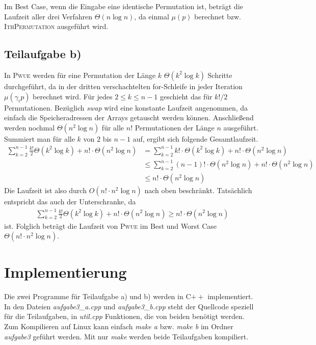 \documentclass[a4paper, 11pt, ngerman]{article}
\begin{document}
Im Best Case, wenn die Eingabe eine identische Permutation ist, beträgt die Laufzeit aller drei Verfahren $\Theta(n \log n)$, da einmal $\mu(p)$ berechnet bzw. \textsc{IthPermutation} ausgeführt wird.

\subsection{Teilaufgabe b)}

In \textsc{Pwue} werden für eine Permutation der Länge $k$ $\Theta(k^2 \log k)$ Schritte durchgeführt, da in der dritten verschachtelten for-Schleife in jeder Iteration $\mu(\gamma_i p)$ berechnet wird. Für jedes $2 \le k \le n - 1$ geschieht das für $k! / 2$ Permutationen. Bezüglich \emph{swap} wird eine konstante Laufzeit angenommen, da einfach die Speicheradressen der Arrays getauscht werden können. Anschließend werden nochmal $\Theta(n^2 \log n)$ für alle $n!$ Permutationen der Länge $n$ ausgeführt. Summiert man für alle $k$ von $2$ bis $n - 1$ auf, ergibt sich folgende Gesamtlaufzeit.
\begin{align*}
    \sum_{k = 2}^{n - 1} \frac {k!} 2 \Theta(k^2 \log k) + n! \cdot \Theta(n^2 \log n)
     & = \sum_{k = 2}^{n-1} k! \cdot \Theta(k^2 \log k) + n! \cdot \Theta(n^2 \log n)           \\
     & \le \sum_{k = 2}^{n - 1} (n - 1)! \cdot \Theta(n^2 \log n) + n! \cdot \Theta(n^2 \log n) \\
     & \le n! \cdot \Theta(n^2 \log n)
\end{align*}
Die Laufzeit ist also durch $O(n! \cdot n^2 \log n)$ nach oben beschränkt. Tatsächlich entspricht das auch der Unterschranke, da
\begin{align*}
    \sum_{k = 2}^{n - 1} \frac {k!} 2 \Theta(k^2 \log k) + n! \cdot \Theta(n^2 \log n)
    \ge n! \cdot \Theta(n^2 \log n)
\end{align*}
ist. Folglich beträgt die Laufzeit von \textsc{Pwue} im Best und Worst Case $\Theta(n! \cdot n^2 \log n)$.

\section{Implementierung}

Die zwei Programme für Teilaufgabe a) und b) werden in C$++$ implementiert. In den Dateien \emph{aufgabe3\_a.cpp} und \emph{aufgabe3\_b.cpp} steht der Quellcode speziell für die Teilaufgaben, in \emph{util.cpp} Funktionen, die von beiden benötigt werden. Zum Kompilieren auf Linux kann einfach \emph{make a} bzw. \emph{make b} im Ordner \emph{aufgabe3} geführt werden. Mit nur \emph{make} werden beide Teilaufgaben kompiliert.
\bigskip
\end{document}
